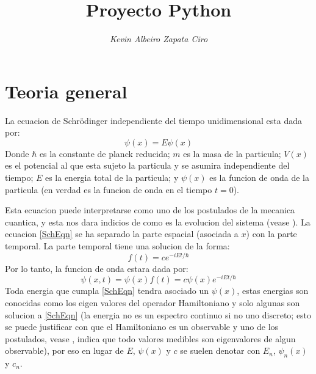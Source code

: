 \documentclass[a4paper, twocolumn, 10pt]{article}
\title{ 
    \textbf{Proyecto Python} 
}
\author{ 
    \renewcommand{\thefootnote}{\arabic{footnote}}
    \textit{Kevin Albeiro Zapata Ciro\footnotemark[1]}
}
\date{}
\begin{document}
 



\section{Teoria general}
    La ecuacion de Schrödinger independiente del tiempo unidimensional esta dada por:
    \begin{equation}
        [- \frac{\hbar^{2}}{2m} \frac{d^{2}}{dx^{2}} + V(x)] \psi(x) = E\psi(x)
        \label{SchEqn}
    \end{equation}
    Donde $\hbar$ es la constante de planck reducida; $m$ es la masa de la particula; $V(x)$ es el potencial al que esta sujeto la particula y se asumira independiente del tiempo; $E$ es la energia total de la particula; y $\psi(x)$ es la funcion de onda de la particula (en verdad es la funcion de onda en el tiempo $t=0$).
    
    Esta ecuacion puede interpretarse como uno de los postulados de la mecanica cuantica, y esta nos 
    dara indicios de como es la evolucion del sistema (vease \cite{quantum-cohen}). La ecuacion \ref{SchEqn} se ha separado la parte espacial (asociada a $x$) con la parte temporal. La parte temporal tiene una solucion de la forma:
    \begin{equation}
        f(t) = c e^{-iEt/\hbar}
    \end{equation}
    Por lo tanto, la funcion de onda estara dada por:
    \begin{equation}
        \psi(x,t) = \psi(x)f(t) = c\psi(x)e^{-iEt/\hbar}
    \end{equation}
    Toda energia que cumpla \ref{SchEqn} tendra asociado un $\psi(x)$, estas energias son conocidas como los eigen valores del operador Hamiltoniano y solo algunas son solucion a \ref{SchEqn} (la energia no es un espectro continuo si no uno discreto; esto se puede justificar con que el Hamiltoniano es un observable y uno de los postulados, vease \cite{quantum-cohen}, indica que todo valores medibles son eigenvalores de algun observable), por eso en lugar de $E$, $\psi(x)$ y $c$ se suelen denotar con $E_{n}$, $\psi_{n}(x)$ y $c_{n}$.
    
\end{document}
